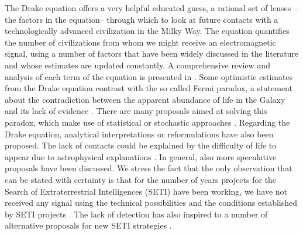 \documentclass[crop]{CSLB}
\begin{document}
The Drake equation \citep{drake_intelligent_1962} offers a very
helpful educated guess, a rational set of lenses --the factors in the
equation-- through which to look at future contacts with a
technologically advanced civilization in the Milky Way.
%
The equation quantifies the number of civilizations from whom we might
receive an electromagnetic signal, using a number of factors that have
been widely discussed in the literature and whose estimates are
updated constantly.
%
A comprehensive review and analysis of each term of the equation is
presented in \citet{vakoch_drake_2015}.
%
Some optimistic estimates from the Drake equation contrast with the so
called Fermi paradox, a statement about the contradiction between the
apparent abundance of life in the Galaxy and its lack of evidence
\citep[e.g. ][]{hart_explanation_1975, brin_great_1983,
barlow_galactic_2012, forgan_galactic_2016, vanhouten_isthere_2017,
Sotos_biotechnology_2019, carroll_nellemback_fermi_2019}.
%
There are many proposals aimed at solving this paradox, which make use
of statistical \citep{solomonides_probabilistic_2016,
vanhouten_isthere_2017, horvat_calculating_2007,
maccone_statistical_2015} or stochastic approaches
\citep{forgan_numerical_2009, bloetscher_using_2019,
glade_stochastic_2011, forgan_numerical_2010}.
%
Regarding the Drake equation, analytical interpretations
\citep{prantzos_joint_2013,
smith_broadcasting_2009} or reformulations
\citep[][and references therein]{burchell_whither_2006} have also been
proposed.
%
The lack of contacts could be explained by the difficulty of life to
appear due to astrophysical explanations
\citep{annis_astrophysical_1999}.
%
In general, also more speculative proposals
\citep{barlow_galactic_2013, lampton_information_2013,
conway_three_2018, forgan_galactic_2017} have been discussed.
% 
\Fpagebreak
%
We stress the fact that the only observation that can be stated with
certainty is that for the number of years projects for the Search of
Extraterrestrial Intelligences (SETI) have been working, we have not
received any signal using the technical possibilities and the
conditions established by SETI projects \citep{tarter_search_2001}.
%
The lack of detection has also inspired to a number of alternative
proposals for new SETI strategies \citep{forgan_exoplanet_2017,
balbi_impact_2018, loeb_eavesdropping_2006, maccone_KLT_2010,
tarter_advancing_2009, enriquez_breakthrough_2017, loeb_relative_2016,
maccone_SETI_2011,  lingam_relative_2019, wright_theGsearch_2015,
maccone_SETI_2013, maccone_lognormals_2014, harp_application_2018,
forgan_possibility_2013, forgan_galactic_2017, funes_searching_2019}.
\end{document}
